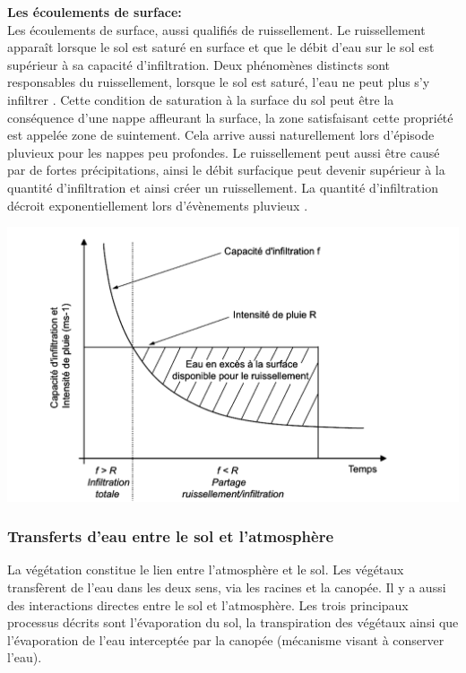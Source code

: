 \documentclass[a4paper,11pt]{article}
\begin{document}
\textbf{Les écoulements de surface:}\\

Les écoulements de surface, aussi qualifiés de ruissellement. Le ruissellement apparaît lorsque le sol est saturé en surface et que le débit d'eau sur le sol est supérieur à sa capacité d'infiltration. Deux phénomènes distincts sont responsables du ruissellement, lorsque le sol est saturé, l’eau ne peut plus s’y infiltrer \cite{cappus1960etude}. Cette condition de saturation à la surface du sol peut être la conséquence d'une nappe affleurant la surface, la zone satisfaisant cette propriété est appelée zone de suintement. Cela arrive aussi naturellement lors d'épisode pluvieux pour les nappes peu profondes. Le ruissellement peut aussi être causé par de fortes précipitations, ainsi le débit surfacique peut devenir supérieur à la quantité d'infiltration et ainsi créer un ruissellement. La quantité d'infiltration décroit exponentiellement lors d'évènements pluvieux \cite{horton1933role}.  

\begin{center}
	\captionsetup{type=figure}
	\includegraphics[scale=0.2]{ruissellement.png}
\end{center} 

\subsubsection{Transferts d'eau entre le sol et l'atmosphère}
\label{ch:mecanismes}

La végétation constitue le lien entre l'atmosphère et le sol. Les végétaux transfèrent de l'eau dans les deux sens, via les racines et la canopée. Il y a aussi des interactions directes entre le sol et l'atmosphère. Les trois principaux processus décrits sont l'évaporation du sol, la transpiration des végétaux ainsi que l'évaporation de l'eau interceptée par la canopée (mécanisme visant à conserver l'eau).\\
\end{document}
